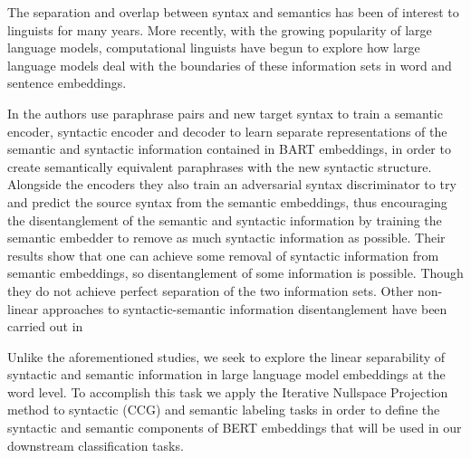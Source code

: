 \documentclass[11pt,a4paper]{article}
\begin{document}

The separation and overlap between syntax and semantics has been of interest to linguists for many years. More recently, with the growing popularity of large language models, computational linguists have begun to explore how large language models deal with the boundaries of these information sets in word and sentence embeddings. 

In \citep{disentangle} the authors use paraphrase pairs and new target syntax to train a semantic encoder, syntactic encoder and decoder to learn separate representations of the semantic and syntactic information contained in BART embeddings, in order to create semantically equivalent paraphrases with the new syntactic structure. Alongside the encoders they also train an adversarial syntax discriminator to try and predict the source syntax from the semantic embeddings, thus encouraging the disentanglement of the semantic and syntactic information by training the semantic embedder to remove as much syntactic information as possible. Their results show that one can achieve some removal of syntactic information from semantic embeddings, so disentanglement of some information is possible. Though they do not achieve perfect separation of the two information sets. Other non-linear approaches to syntactic-semantic information disentanglement have been carried out in \citep{multiDis}


Unlike the aforementioned studies, we seek to explore the linear separability of syntactic and semantic information in large language model embeddings at the word level. To accomplish this task we apply the Iterative Nullspace Projection method to syntactic (CCG) and semantic labeling tasks in order to define the syntactic and semantic components of BERT embeddings that will be used in our downstream classification tasks. 
\end{document}
